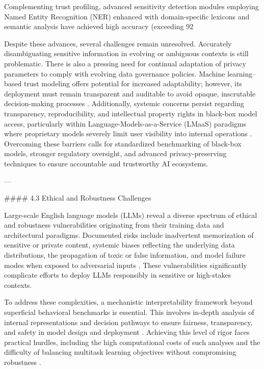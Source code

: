 \documentclass[11pt]{article}
\begin{document}
Complementing trust profiling, advanced sensitivity detection modules employing Named Entity Recognition (NER) enhanced with domain-specific lexicons and semantic analysis have achieved high accuracy (exceeding 92%

Despite these advances, several challenges remain unresolved. Accurately disambiguating sensitive information in evolving or ambiguous contexts is still problematic. There is also a pressing need for continual adaptation of privacy parameters to comply with evolving data governance policies. Machine learning–based trust modeling offers potential for increased adaptability; however, its deployment must remain transparent and auditable to avoid opaque, inscrutable decision-making processes \cite{ref11}. Additionally, systemic concerns persist regarding transparency, reproducibility, and intellectual property rights in black-box model access, particularly within Language-Models-as-a-Service (LMaaS) paradigms where proprietary models severely limit user visibility into internal operations \cite{ref8}. Overcoming these barriers calls for standardized benchmarking of black-box models, stronger regulatory oversight, and advanced privacy-preserving techniques to ensure accountable and trustworthy AI ecosystems.

---

#### 4.3 Ethical and Robustness Challenges

Large-scale English language models (LLMs) reveal a diverse spectrum of ethical and robustness vulnerabilities originating from their training data and architectural paradigms. Documented risks include inadvertent memorization of sensitive or private content, systemic biases reflecting the underlying data distributions, the propagation of toxic or false information, and model failure modes when exposed to adversarial inputs \cite{ref34}. These vulnerabilities significantly complicate efforts to deploy LLMs responsibly in sensitive or high-stakes contexts.

To address these complexities, a mechanistic interpretability framework beyond superficial behavioral benchmarks is essential. This involves in-depth analysis of internal representations and decision pathways to ensure fairness, transparency, and safety in model design and deployment \cite{ref11,ref12,ref13,ref34,ref35}. Achieving this level of rigor faces practical hurdles, including the high computational costs of such analyses and the difficulty of balancing multitask learning objectives without compromising robustness \cite{ref16}.
\end{document}
